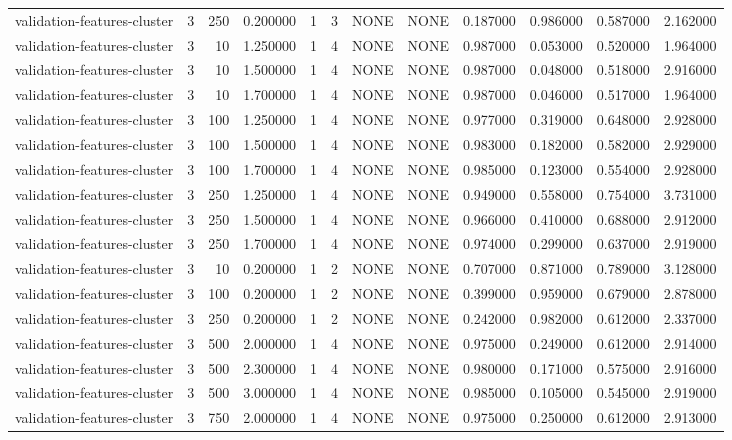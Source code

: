 \begin{tabular}{lrrrllllrrrr}
validation-features-cluster & 3 & 250 & 0.200000 & 1 & 3 & NONE & NONE & 0.187000 & 0.986000 & 0.587000 & 2.162000 \\
validation-features-cluster & 3 & 10 & 1.250000 & 1 & 4 & NONE & NONE & 0.987000 & 0.053000 & 0.520000 & 1.964000 \\
validation-features-cluster & 3 & 10 & 1.500000 & 1 & 4 & NONE & NONE & 0.987000 & 0.048000 & 0.518000 & 2.916000 \\
validation-features-cluster & 3 & 10 & 1.700000 & 1 & 4 & NONE & NONE & 0.987000 & 0.046000 & 0.517000 & 1.964000 \\
validation-features-cluster & 3 & 100 & 1.250000 & 1 & 4 & NONE & NONE & 0.977000 & 0.319000 & 0.648000 & 2.928000 \\
validation-features-cluster & 3 & 100 & 1.500000 & 1 & 4 & NONE & NONE & 0.983000 & 0.182000 & 0.582000 & 2.929000 \\
validation-features-cluster & 3 & 100 & 1.700000 & 1 & 4 & NONE & NONE & 0.985000 & 0.123000 & 0.554000 & 2.928000 \\
validation-features-cluster & 3 & 250 & 1.250000 & 1 & 4 & NONE & NONE & 0.949000 & 0.558000 & 0.754000 & 3.731000 \\
validation-features-cluster & 3 & 250 & 1.500000 & 1 & 4 & NONE & NONE & 0.966000 & 0.410000 & 0.688000 & 2.912000 \\
validation-features-cluster & 3 & 250 & 1.700000 & 1 & 4 & NONE & NONE & 0.974000 & 0.299000 & 0.637000 & 2.919000 \\
validation-features-cluster & 3 & 10 & 0.200000 & 1 & 2 & NONE & NONE & 0.707000 & 0.871000 & 0.789000 & 3.128000 \\
validation-features-cluster & 3 & 100 & 0.200000 & 1 & 2 & NONE & NONE & 0.399000 & 0.959000 & 0.679000 & 2.878000 \\
validation-features-cluster & 3 & 250 & 0.200000 & 1 & 2 & NONE & NONE & 0.242000 & 0.982000 & 0.612000 & 2.337000 \\
validation-features-cluster & 3 & 500 & 2.000000 & 1 & 4 & NONE & NONE & 0.975000 & 0.249000 & 0.612000 & 2.914000 \\
validation-features-cluster & 3 & 500 & 2.300000 & 1 & 4 & NONE & NONE & 0.980000 & 0.171000 & 0.575000 & 2.916000 \\
validation-features-cluster & 3 & 500 & 3.000000 & 1 & 4 & NONE & NONE & 0.985000 & 0.105000 & 0.545000 & 2.919000 \\
validation-features-cluster & 3 & 750 & 2.000000 & 1 & 4 & NONE & NONE & 0.975000 & 0.250000 & 0.612000 & 2.913000 \\

\end{tabular}
